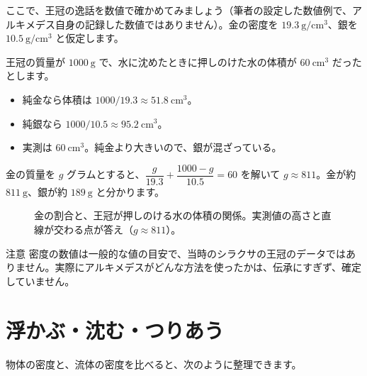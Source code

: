 \documentclass[a4paper,11pt,openany]{ltjsbook}
\begin{document}
ここで、王冠の逸話を数値で確かめてみましょう（筆者の設定した数値例で、アルキメデス自身の記録した数値ではありません）。金の密度を $19.3\ \mathrm{g/cm^3}$、銀を $10.5\ \mathrm{g/cm^3}$ と仮定します。

王冠の質量が $1000\ \mathrm{g}$ で、水に沈めたときに押しのけた水の体積が $60\ \mathrm{cm^3}$ だったとします。

\begin{itemize}[leftmargin=1.5em]
\item 純金なら体積は $1000/19.3\approx51.8\ \mathrm{cm^3}$。
\item 純銀なら $1000/10.5\approx95.2\ \mathrm{cm^3}$。
\item 実測は $60\ \mathrm{cm^3}$。純金より大きいので、銀が混ざっている。
\end{itemize}

金の質量を $g$ グラムとすると、$\dfrac{g}{19.3}+\dfrac{1000-g}{10.5}=60$ を解いて $g\approx811$。金が約 $811\ \mathrm{g}$、銀が約 $189\ \mathrm{g}$ と分かります。

\begin{figure}[htbp]
\centering
{}
\caption{金の割合と、王冠が押しのける水の体積の関係。実測値の高さと直線が交わる点が答え（$g\approx811$）。}
\end{figure}

\begin{notebox}{注意}
密度の数値は一般的な値の目安で、当時のシラクサの王冠のデータではありません。実際にアルキメデスがどんな方法を使ったかは、伝承にすぎず、確定していません。
\end{notebox}

\section{浮かぶ・沈む・つりあう}

物体の密度と、流体の密度を比べると、次のように整理できます。
\end{document}
